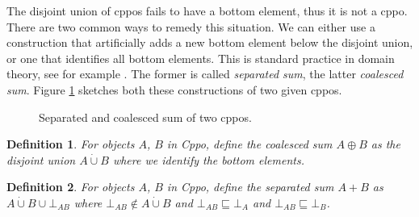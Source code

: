\documentclass[a4paper]{article}
\newcommand{\below}{\sqsubseteq}
\newtheorem{definition}{Definition}[section]
\begin{document}
The disjoint union of cppos fails to have a bottom element, thus it is not a
cppo. There are two common ways to remedy this situation. We can either use a
construction that artificially adds a new bottom element below the disjoint
union, or one that identifies all bottom elements. This is standard practice in
domain theory, see for example \cite{Gunter1992}. The former is called
\emph{separated sum}, the latter \emph{coalesced sum}.  Figure
\ref{figSeparatedAndCoalescedSum} sketches both these constructions of two given
cppos.

\begin{figure}[ht]
\begin{center}


\end{center}
\caption{Separated and coalesced sum of two cppos.} \label{figSeparatedAndCoalescedSum}
\end{figure}

\begin{definition} \label{defCoalescedSum}
For objects $A$, $B$ in Cppo, define the \emph{coalesced sum} $A \oplus B$ as
the disjoint union $A \dot\cup B$ where we identify the bottom elements.
\end{definition}

\begin{definition} \label{defSeparatedSum}
For objects $A$, $B$ in Cppo, define the \emph{separated sum} $A + B$ as $A
\dot\cup B \cup \bot_{AB}$ where $\bot_{AB} \not\in A \dot\cup B$ and $\bot_{AB}
\below \bot_A$ and $\bot_{AB} \below \bot_B$.
\end{definition}
\end{document}
